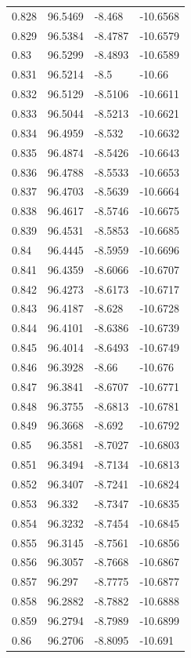 \begin{tabular}{llll}
0.828 & 96.5469 & -8.468 & -10.6568 \\
0.829 & 96.5384 & -8.4787 & -10.6579 \\
0.83 & 96.5299 & -8.4893 & -10.6589 \\
0.831 & 96.5214 & -8.5 & -10.66 \\
0.832 & 96.5129 & -8.5106 & -10.6611 \\
0.833 & 96.5044 & -8.5213 & -10.6621 \\
0.834 & 96.4959 & -8.532 & -10.6632 \\
0.835 & 96.4874 & -8.5426 & -10.6643 \\
0.836 & 96.4788 & -8.5533 & -10.6653 \\
0.837 & 96.4703 & -8.5639 & -10.6664 \\
0.838 & 96.4617 & -8.5746 & -10.6675 \\
0.839 & 96.4531 & -8.5853 & -10.6685 \\
0.84 & 96.4445 & -8.5959 & -10.6696 \\
0.841 & 96.4359 & -8.6066 & -10.6707 \\
0.842 & 96.4273 & -8.6173 & -10.6717 \\
0.843 & 96.4187 & -8.628 & -10.6728 \\
0.844 & 96.4101 & -8.6386 & -10.6739 \\
0.845 & 96.4014 & -8.6493 & -10.6749 \\
0.846 & 96.3928 & -8.66 & -10.676 \\
0.847 & 96.3841 & -8.6707 & -10.6771 \\
0.848 & 96.3755 & -8.6813 & -10.6781 \\
0.849 & 96.3668 & -8.692 & -10.6792 \\
0.85 & 96.3581 & -8.7027 & -10.6803 \\
0.851 & 96.3494 & -8.7134 & -10.6813 \\
0.852 & 96.3407 & -8.7241 & -10.6824 \\
0.853 & 96.332 & -8.7347 & -10.6835 \\
0.854 & 96.3232 & -8.7454 & -10.6845 \\
0.855 & 96.3145 & -8.7561 & -10.6856 \\
0.856 & 96.3057 & -8.7668 & -10.6867 \\
0.857 & 96.297 & -8.7775 & -10.6877 \\
0.858 & 96.2882 & -8.7882 & -10.6888 \\
0.859 & 96.2794 & -8.7989 & -10.6899 \\
0.86 & 96.2706 & -8.8095 & -10.691 \\

\end{tabular}
